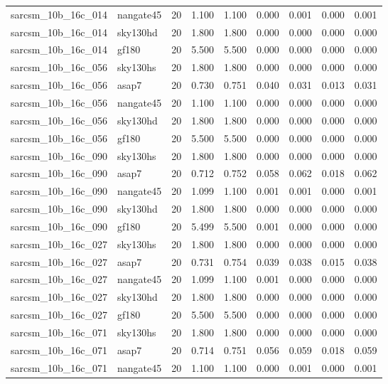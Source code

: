 \begin{tabular}{llrrrrrrr}
sarcsm\_10b\_16c\_014 & nangate45 & 20 & 1.100 & 1.100 & 0.000 & 0.001 & 0.000 & 0.001 \\
sarcsm\_10b\_16c\_014 & sky130hd & 20 & 1.800 & 1.800 & 0.000 & 0.000 & 0.000 & 0.000 \\
sarcsm\_10b\_16c\_014 & gf180 & 20 & 5.500 & 5.500 & 0.000 & 0.000 & 0.000 & 0.000 \\
sarcsm\_10b\_16c\_056 & sky130hs & 20 & 1.800 & 1.800 & 0.000 & 0.000 & 0.000 & 0.000 \\
sarcsm\_10b\_16c\_056 & asap7 & 20 & 0.730 & 0.751 & 0.040 & 0.031 & 0.013 & 0.031 \\
sarcsm\_10b\_16c\_056 & nangate45 & 20 & 1.100 & 1.100 & 0.000 & 0.000 & 0.000 & 0.000 \\
sarcsm\_10b\_16c\_056 & sky130hd & 20 & 1.800 & 1.800 & 0.000 & 0.000 & 0.000 & 0.000 \\
sarcsm\_10b\_16c\_056 & gf180 & 20 & 5.500 & 5.500 & 0.000 & 0.000 & 0.000 & 0.000 \\
sarcsm\_10b\_16c\_090 & sky130hs & 20 & 1.800 & 1.800 & 0.000 & 0.000 & 0.000 & 0.000 \\
sarcsm\_10b\_16c\_090 & asap7 & 20 & 0.712 & 0.752 & 0.058 & 0.062 & 0.018 & 0.062 \\
sarcsm\_10b\_16c\_090 & nangate45 & 20 & 1.099 & 1.100 & 0.001 & 0.001 & 0.000 & 0.001 \\
sarcsm\_10b\_16c\_090 & sky130hd & 20 & 1.800 & 1.800 & 0.000 & 0.000 & 0.000 & 0.000 \\
sarcsm\_10b\_16c\_090 & gf180 & 20 & 5.499 & 5.500 & 0.001 & 0.000 & 0.000 & 0.000 \\
sarcsm\_10b\_16c\_027 & sky130hs & 20 & 1.800 & 1.800 & 0.000 & 0.000 & 0.000 & 0.000 \\
sarcsm\_10b\_16c\_027 & asap7 & 20 & 0.731 & 0.754 & 0.039 & 0.038 & 0.015 & 0.038 \\
sarcsm\_10b\_16c\_027 & nangate45 & 20 & 1.099 & 1.100 & 0.001 & 0.000 & 0.000 & 0.000 \\
sarcsm\_10b\_16c\_027 & sky130hd & 20 & 1.800 & 1.800 & 0.000 & 0.000 & 0.000 & 0.000 \\
sarcsm\_10b\_16c\_027 & gf180 & 20 & 5.500 & 5.500 & 0.000 & 0.000 & 0.000 & 0.000 \\
sarcsm\_10b\_16c\_071 & sky130hs & 20 & 1.800 & 1.800 & 0.000 & 0.000 & 0.000 & 0.000 \\
sarcsm\_10b\_16c\_071 & asap7 & 20 & 0.714 & 0.751 & 0.056 & 0.059 & 0.018 & 0.059 \\
sarcsm\_10b\_16c\_071 & nangate45 & 20 & 1.100 & 1.100 & 0.000 & 0.001 & 0.000 & 0.001 \\

\end{tabular}
